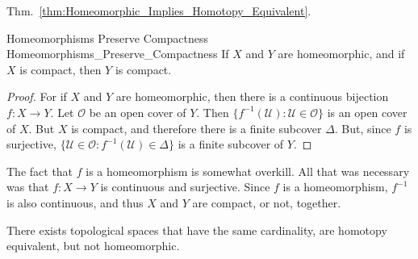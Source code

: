 \documentclass{article}                                                        %
\begin{document}
        Thm.~\ref{thm:Homeomorphic_Implies_Homotopy_Equivalent}.
        \begin{ltheorem}{Homeomorphisms Preserve Compactness}
                        {Homeomorphisms_Preserve_Compactness}
            If $X$ and $Y$ are homeomorphic, and if $X$ is compact,
            then $Y$ is compact.
        \end{ltheorem}
        \begin{proof}
            For if $X$ and $Y$ are homeomorphic, then there
            is a continuous bijection $f:X\rightarrow{Y}$.
            Let $\mathcal{O}$ be an open cover of $Y$.
            Then $\{f^{-1}(\mathcal{U}):\mathcal{U}\in\mathcal{O}\}$
            is an open cover of $X$. But $X$ is compact, and therefore
            there is a finite subcover $\Delta$. But, since $f$ is
            surjective,
            $\{\mathcal{U}\in\mathcal{O}:f^{-1}(\mathcal{U})\in\Delta\}$
            is a finite subcover of $Y$.
        \end{proof}
        The fact that $f$ is a homeomorphism is somewhat overkill.
        All that was necessary was that $f:X\rightarrow{Y}$ is continuous
        and surjective. Since $f$ is a homeomorphism, $f^{-1}$ is also
        continuous, and thus $X$ and $Y$ are compact, or not, together.
        \begin{theorem}
            \label{thm:Homotopy_Equivalance_of_Plane_without_point_%
                   and_unit_disc_but_not_homeomorphic}
            There exists topological spaces that have the same cardinality,
            are homotopy equivalent, but not homeomorphic.
        \end{theorem}
\end{document}
